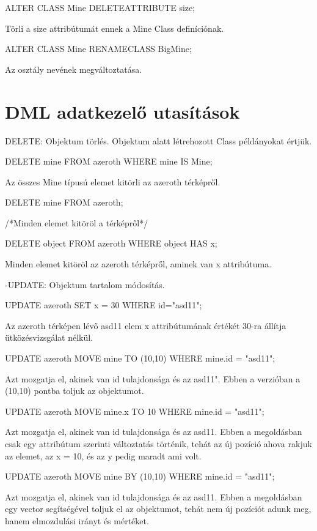 \begin{sql}
\begin{sql}
ALTER CLASS Mine DELETEATTRIBUTE size;
\end{sql}
Törli a size attribútumát ennek a Mine Class definíciónak.

\begin{sql}
ALTER CLASS Mine RENAMECLASS BigMine;
\end{sql}
Az osztály nevének megváltoztatása.

\section{DML adatkezelő utasítások}

DELETE: Objektum törlés. Objektum alatt létrehozott Class példányokat értjük.

\begin{sql}
DELETE mine FROM azeroth WHERE  mine IS Mine;
\end{sql}
Az összes Mine típusú elemet kitörli az azeroth térképről.
\begin{sql}
DELETE mine FROM azeroth;
\end{sql}
/*Minden elemet kitöröl a térképről*/
\begin{sql}
DELETE object FROM azeroth WHERE object HAS x;
\end{sql}
Minden elemet kitöröl az azeroth térképről, aminek van x attribútuma.

-UPDATE: Objektum tartalom módosítás.
\begin{sql}
UPDATE azeroth SET x = 30 WHERE id="asd11";
\end{sql}
Az azeroth térképen lévő asd11 elem x attribútumának értékét 30-ra állítja ütközésvizsgálat nélkül.

\begin{sql}
UPDATE azeroth MOVE  mine TO  (10,10) WHERE mine.id = "asd11";
\end{sql}
Azt mozgatja el, akinek van id tulajdonsága és az asd11". Ebben a verzióban a (10,10) pontba toljuk az objektumot.
\begin{sql}
UPDATE azeroth MOVE  mine.x TO 10 WHERE mine.id = "asd11";
\end{sql}
Azt mozgatja el, akinek van id tulajdonsága és az asd11. Ebben a megoldásban csak egy attribútum szerinti változtatás történik, tehát az új pozíció ahova rakjuk az elemet, az x = 10, és az y pedig maradt ami volt.
\begin{sql}
UPDATE azeroth MOVE  mine BY  (10,10) WHERE mine.id = "asd11";
\end{sql}
Azt mozgatja el, akinek van id tulajdonsága és az asd11. Ebben a megoldásban egy vector segítségével toljuk el az objektumot, tehát nem új pozíciót adunk meg, hanem elmozdulási irányt és mértéket.


\end{sql}
